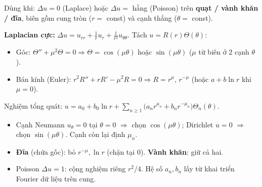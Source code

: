 \begin{dieukienbox}
Dùng khi: $\Delta u=0$ (Laplace) hoặc $\Delta u=$ hằng (Poisson) trên \textbf{quạt / vành khăn / đĩa},
biên gồm cung tròn ($r=$ const) và cạnh thẳng ($\theta=$ const).
\end{dieukienbox}

\begin{nhobox}
\textbf{Laplacian cực:} $\Delta u=u_{rr}+\frac1r u_r+\frac{1}{r^2}u_{\theta\theta}$. Tách $u=R(r)\Theta(\theta)$:
\begin{itemize}
  \item Góc: $\Theta''+\mu^2\Theta=0\Rightarrow \Theta=\cos(\mu\theta)$ hoặc $\sin(\mu\theta)$ ($\mu$ từ biên ở 2 cạnh $\theta$).
  \item Bán kính (Euler): $r^2R''+rR'-\mu^2 R=0\Rightarrow R=r^{\mu},\,r^{-\mu}$ (hoặc $a+b\ln r$ khi $\mu=0$).
\end{itemize}
Nghiệm tổng quát:
$\displaystyle u=a_0+b_0\ln r+\sum_{n\ge1}\big(a_n r^{\mu_n}+b_n r^{-\mu_n}\big)\Theta_n(\theta).$
\end{nhobox}

\begin{meobox}
\begin{itemize}
  \item Cạnh Neumann $u_\theta=0$ tại $\theta=0$ $\Rightarrow$ chọn $\cos(\mu\theta)$; Dirichlet $u=0$ $\Rightarrow$ chọn $\sin(\mu\theta)$. Cạnh còn lại định $\mu_n$.
  \item \textbf{Đĩa} (chứa gốc): bỏ $r^{-\mu},\ln r$ (chặn tại $0$). \textbf{Vành khăn}: giữ cả hai.
  \item Poisson $\Delta u=1$: cộng nghiệm riêng $r^2/4$. Hệ số $a_n,b_n$ lấy từ khai triển Fourier dữ liệu trên cung.
\end{itemize}
\end{meobox}